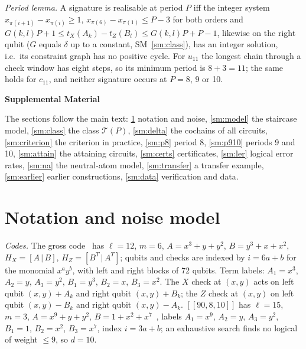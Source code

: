\documentclass[aps,prl,twocolumn,superscriptaddress,nofootinbib]{revtex4-2}
\newcommand{\code}[1]{[[#1]]}
\newcommand{\T}{\mathcal{T}}
\begin{document}
\emph{Period lemma.} A signature is realisable at period $P$ iff the integer system
$x_{\pi(i+1)}-x_{\pi(i)}\ge1$, $x_{\pi(6)}-x_{\pi(1)}\le P-3$ for both orders and
$G(k,l)P+1\le t_X(A_k)-t_Z(B_l)\le G(k,l)P+P-1$, likewise on the right qubit ($G$ equals
$\delta$ up to a constant, SM~\ref{sm:class}), has an integer solution, i.e.\ its constraint
graph has no positive cycle. For $u_{11}$ the longest chain through a check window has
eight steps, so its minimum period is $8+3=11$; the same holds for $c_{11}$, and neither
signature occurs at $P=8$, 9 or 10.

\clearpage
\onecolumngrid
\begin{center}
\textbf{\large Supplemental Material}
\end{center}
\setcounter{secnumdepth}{1}
\setcounter{section}{0}
\renewcommand{\thesection}{S\arabic{section}}
\setcounter{table}{0}
\renewcommand{\thetable}{S\arabic{table}}
\renewcommand{\theHtable}{S\arabic{table}}
\setcounter{figure}{0}
\renewcommand{\thefigure}{S\arabic{figure}}
\renewcommand{\theHfigure}{S\arabic{figure}}
\setcounter{equation}{0}
\renewcommand{\theequation}{S\arabic{equation}}
\renewcommand{\theHequation}{S\arabic{equation}}

The sections follow the main text: \ref{sm:notation} notation and noise,
\ref{sm:model} the staircase model, \ref{sm:class} the class $\T(P)$, \ref{sm:delta} the
cochains of all circuits, \ref{sm:criterion} the criterion in practice, \ref{sm:p8} period
8, \ref{sm:p910} periods 9 and 10, \ref{sm:attain} the attaining circuits,
\ref{sm:certs} certificates, \ref{sm:ler} logical error rates, \ref{sm:na} the
neutral-atom model, \ref{sm:transfer} a transfer example, \ref{sm:earlier} earlier
constructions, \ref{sm:data} verification and data.

\section{Notation and noise model}\label{sm:notation}
\emph{Codes.} The gross code~\cite{Bravyi2024} has $\ell=12$, $m=6$, $A=x^3+y+y^2$,
$B=y^3+x+x^2$, $H_X=[A\,|\,B]$, $H_Z=[B^{T}\,|\,A^{T}]$; qubits and checks are indexed by
$i=6a+b$ for the monomial $x^ay^b$, with left and right blocks of 72 qubits. Term labels:
$A_1=x^3$, $A_2=y$, $A_3=y^2$, $B_1=y^3$, $B_2=x$, $B_3=x^2$. The $X$ check at $(x,y)$ acts
on left qubit $(x,y)+A_k$ and right qubit $(x,y)+B_k$; the $Z$ check at $(x,y)$ on left
qubit $(x,y)-B_k$ and right qubit $(x,y)-A_k$. $\code{90,8,10}$ has $\ell=15$, $m=3$,
$A=x^9+y+y^2$, $B=1+x^2+x^7$~\cite{Bravyi2024}, labels $A_1=x^9$, $A_2=y$, $A_3=y^2$,
$B_1=1$, $B_2=x^2$, $B_3=x^7$, index $i=3a+b$; an exhaustive search finds no logical of
weight $\le9$, so $d=10$.
\end{document}

